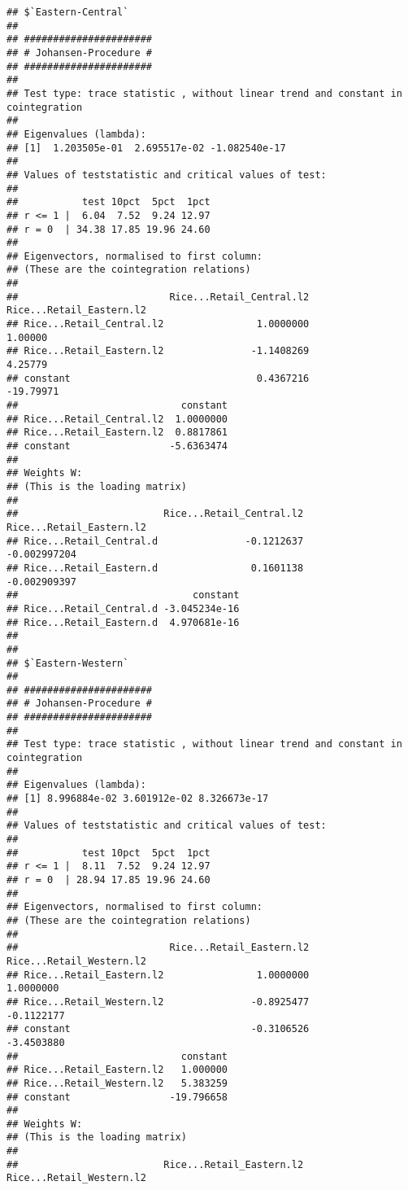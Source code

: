\documentclass[12pt,]{article}
\begin{document}
\begin{verbatim}
## $`Eastern-Central`
## 
## ###################### 
## # Johansen-Procedure # 
## ###################### 
## 
## Test type: trace statistic , without linear trend and constant in cointegration 
## 
## Eigenvalues (lambda):
## [1]  1.203505e-01  2.695517e-02 -1.082540e-17
## 
## Values of teststatistic and critical values of test:
## 
##           test 10pct  5pct  1pct
## r <= 1 |  6.04  7.52  9.24 12.97
## r = 0  | 34.38 17.85 19.96 24.60
## 
## Eigenvectors, normalised to first column:
## (These are the cointegration relations)
## 
##                          Rice...Retail_Central.l2 Rice...Retail_Eastern.l2
## Rice...Retail_Central.l2                1.0000000                  1.00000
## Rice...Retail_Eastern.l2               -1.1408269                  4.25779
## constant                                0.4367216                -19.79971
##                            constant
## Rice...Retail_Central.l2  1.0000000
## Rice...Retail_Eastern.l2  0.8817861
## constant                 -5.6363474
## 
## Weights W:
## (This is the loading matrix)
## 
##                         Rice...Retail_Central.l2 Rice...Retail_Eastern.l2
## Rice...Retail_Central.d               -0.1212637             -0.002997204
## Rice...Retail_Eastern.d                0.1601138             -0.002909397
##                              constant
## Rice...Retail_Central.d -3.045234e-16
## Rice...Retail_Eastern.d  4.970681e-16
## 
## 
## $`Eastern-Western`
## 
## ###################### 
## # Johansen-Procedure # 
## ###################### 
## 
## Test type: trace statistic , without linear trend and constant in cointegration 
## 
## Eigenvalues (lambda):
## [1] 8.996884e-02 3.601912e-02 8.326673e-17
## 
## Values of teststatistic and critical values of test:
## 
##           test 10pct  5pct  1pct
## r <= 1 |  8.11  7.52  9.24 12.97
## r = 0  | 28.94 17.85 19.96 24.60
## 
## Eigenvectors, normalised to first column:
## (These are the cointegration relations)
## 
##                          Rice...Retail_Eastern.l2 Rice...Retail_Western.l2
## Rice...Retail_Eastern.l2                1.0000000                1.0000000
## Rice...Retail_Western.l2               -0.8925477               -0.1122177
## constant                               -0.3106526               -3.4503880
##                            constant
## Rice...Retail_Eastern.l2   1.000000
## Rice...Retail_Western.l2   5.383259
## constant                 -19.796658
## 
## Weights W:
## (This is the loading matrix)
## 
##                         Rice...Retail_Eastern.l2 Rice...Retail_Western.l2

\end{verbatim}
\end{document}
